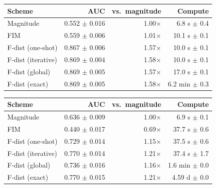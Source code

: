 \begin{tabular}{lrrr}
\toprule
Scheme & AUC & vs.\ magnitude & Compute \\
\midrule
Magnitude & 0.552 $\pm$ 0.016 & 1.00$\times$ & 6.8 s $\pm$ 0.4 \\
FIM & 0.559 $\pm$ 0.006 & 1.01$\times$ & 10.1 s $\pm$ 0.1 \\
F-dist (one-shot) & 0.867 $\pm$ 0.006 & 1.57$\times$ & 10.0 s $\pm$ 0.1 \\
F-dist (iterative) & 0.869 $\pm$ 0.004 & 1.58$\times$ & 10.0 s $\pm$ 0.1 \\
F-dist (global) & 0.869 $\pm$ 0.005 & 1.57$\times$ & 17.0 s $\pm$ 0.1 \\
F-dist (exact) & 0.869 $\pm$ 0.005 & 1.58$\times$ & 6.2 min $\pm$ 0.3 \\
\bottomrule
\end{tabular}

\begin{tabular}{lrrr}
\toprule
Scheme & AUC & vs.\ magnitude & Compute \\
\midrule
Magnitude & 0.636 $\pm$ 0.009 & 1.00$\times$ & 6.9 s $\pm$ 0.1 \\
FIM & 0.440 $\pm$ 0.017 & 0.69$\times$ & 37.7 s $\pm$ 0.6 \\
F-dist (one-shot) & 0.729 $\pm$ 0.014 & 1.15$\times$ & 37.5 s $\pm$ 0.6 \\
F-dist (iterative) & 0.770 $\pm$ 0.014 & 1.21$\times$ & 37.4 s $\pm$ 1.7 \\
F-dist (global) & 0.736 $\pm$ 0.016 & 1.16$\times$ & 1.6 min $\pm$ 0.0 \\
F-dist (exact) & 0.770 $\pm$ 0.015 & 1.21$\times$ & 4.59 d $\pm$ 0.0 \\
\bottomrule
\end{tabular}

